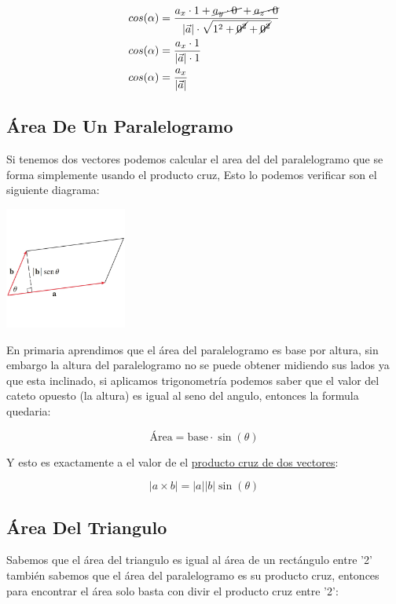 \documentclass{article}
\begin{document}
\[\begin{aligned}
  cos(\alpha) &= \frac{a_x \cdot 1 + \cancel{a_y \cdot 0~} + \cancel{a_z \cdot 0} }{|\vec{a}| \cdot \sqrt{1^2+\cancel{0^2}+\cancel{0^2}}} \\
  cos(\alpha) &= \frac{a_x \cdot 1}{|\vec{a}| \cdot 1} \\
  cos(\alpha) &= \frac{a_x}{|\vec{a}|} \\
\end{aligned} \]

\subsection{Área De Un Paralelogramo}
\label{sec:org34e3760}
Si tenemos dos vectores podemos calcular el area del del paralelogramo que se forma simplemente usando el producto cruz, Esto lo podemos verificar son el siguiente diagrama:

\begin{center}
\includegraphics[width=4cm]{img/producto-cruz.png}
\end{center}

En primaria aprendimos que el área del paralelogramo es base por altura, sin embargo la altura del paralelogramo no se puede obtener midiendo sus lados ya que esta inclinado, si aplicamos trigonometría podemos saber que el valor del cateto opuesto (la altura) es igual al seno del angulo, entonces la formula quedaria:

\[
  {\text{Área} = \text{base} \cdot \sin(\theta)}
\]

Y esto es exactamente a el valor de el \uline{producto cruz de dos vectores}:

\[
  {|a \times b|=|a||b|\sin(\theta)}
\]

\subsection{Área Del Triangulo}
\label{sec:org919b80b}
Sabemos que el área del triangulo es igual al área de un rectángulo entre '2' también sabemos que el área del paralelogramo es su producto cruz, entonces para encontrar el área solo basta con divir el producto cruz entre '2':
\end{document}
